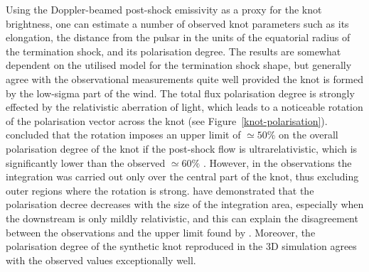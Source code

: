 Using the Doppler-beamed post-shock emissivity as a proxy for the knot brightness, one can estimate a number of observed  knot parameters such as its elongation, the distance from the pulsar in the units of the equatorial radius of the termination shock, and its polarisation degree.     The results are somewhat dependent on the  utilised model for the termination shock shape, but generally agree with the observational measurements quite well provided the knot is formed by the low-sigma part of the wind.  
The total flux polarisation degree is strongly effected by the relativistic aberration of light, which leads to a noticeable rotation of the polarisation vector across the knot (see Figure~\ref{knot-polarisation}).  \citet{YB-15} concluded that the rotation imposes an upper limit 
of $\simeq 50\%$ on the overall polarisation degree of the knot if the post-shock flow is ultrarelativistic, which is significantly lower than the observed $\simeq 60\%$ .  However, in the observations the integration was carried out only over the central part of the knot, thus excluding outer regions where the rotation is strong. \citet{LKP-16} have demonstrated that the polarisation decree decreases with the size of the integration area, especially when the downstream is only mildly relativistic, and this can explain the disagreement  between the observations and the upper limit found by \citet{YB-15}.      
Moreover, the polarisation degree of the synthetic knot reproduced in the 3D simulation \citep{porth-14} agrees with the observed values exceptionally well. 